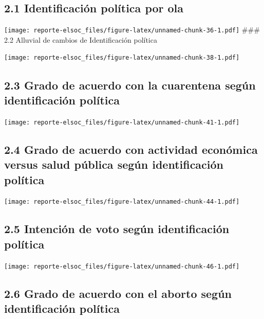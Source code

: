 \documentclass[
  12pt,
  openany]{book}
\begin{document}
\hypertarget{identificaciuxf3n-poluxedtica-por-ola}{%
\subsection{2.1 Identificación política por ola}\label{identificaciuxf3n-poluxedtica-por-ola}}

\texttt{[image: reporte-elsoc\_files/figure-latex/unnamed-chunk-36-1.pdf]}
\#\#\# 2.2 Alluvial de cambios de Identificación política

\texttt{[image: reporte-elsoc\_files/figure-latex/unnamed-chunk-38-1.pdf]}

\hypertarget{grado-de-acuerdo-con-la-cuarentena-seguxfan-identificaciuxf3n-poluxedtica}{%
\subsection{2.3 Grado de acuerdo con la cuarentena según identificación política}\label{grado-de-acuerdo-con-la-cuarentena-seguxfan-identificaciuxf3n-poluxedtica}}

\texttt{[image: reporte-elsoc\_files/figure-latex/unnamed-chunk-41-1.pdf]}

\hypertarget{grado-de-acuerdo-con-actividad-econuxf3mica-versus-salud-puxfablica-seguxfan-identificaciuxf3n-poluxedtica}{%
\subsection{2.4 Grado de acuerdo con actividad económica versus salud pública según identificación política}\label{grado-de-acuerdo-con-actividad-econuxf3mica-versus-salud-puxfablica-seguxfan-identificaciuxf3n-poluxedtica}}

\texttt{[image: reporte-elsoc\_files/figure-latex/unnamed-chunk-44-1.pdf]}

\hypertarget{intenciuxf3n-de-voto-seguxfan-identificaciuxf3n-poluxedtica}{%
\subsection{2.5 Intención de voto según identificación política}\label{intenciuxf3n-de-voto-seguxfan-identificaciuxf3n-poluxedtica}}

\texttt{[image: reporte-elsoc\_files/figure-latex/unnamed-chunk-46-1.pdf]}

\hypertarget{grado-de-acuerdo-con-el-aborto-seguxfan-identificaciuxf3n-poluxedtica}{%
\subsection{2.6 Grado de acuerdo con el aborto según identificación política}\label{grado-de-acuerdo-con-el-aborto-seguxfan-identificaciuxf3n-poluxedtica}}
\end{document}
